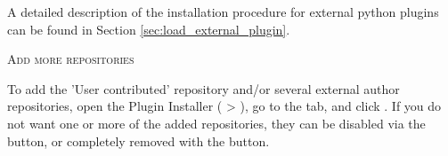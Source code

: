 A detailed description of the installation procedure for external python 
plugins can be found in Section \ref{sec:load_external_plugin}.

\begin{Tip} \caption{\textsc{Add more repositories}}
To add the 'User contributed' repository and/or several external author repositories, open the 
Plugin Installer ( > ),
go to the  tab, and click . 
If you do not want one or more of the added repositories, they can be disabled via the 
 button, or completely removed with the  button.
\end{Tip}
\FloatBarrier
